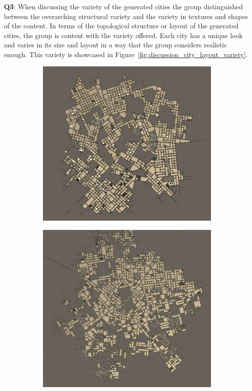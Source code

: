\textbf{Q3}:
When discussing the variety of the generated cities the group distinguished between the overarching structural variety and the variety in textures and shapes of the content.
In terms of the topological structure or layout of the generated cities, the group is content with the variety offered.
Each city has a unique look and varies in its size and layout in a way that the group considers realistic enough.
This variety is showcased in Figure~\ref{fig:discussion_city_layout_variety}.

\begin{figure}[h!]
  \centering
  \begin{subfigure}[b]{0.455\textwidth}
    \includegraphics[width=\textwidth]{figure/discussion_city_layout_1}
  \end{subfigure}
  \quad
  \begin{subfigure}[b]{0.45\textwidth}
    \includegraphics[width=\textwidth]{figure/discussion_city_layout_2}

\end{subfigure}
\end{figure}

